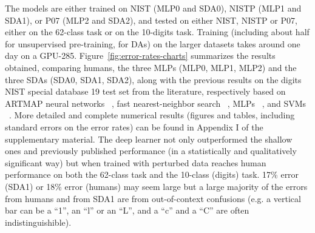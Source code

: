 \documentclass{article} %
\begin{document}
The models are either trained on NIST (MLP0 and SDA0), 
NISTP (MLP1 and SDA1), or P07 (MLP2 and SDA2), and tested
on either NIST, NISTP or P07, either on the 62-class task
or on the 10-digits task. Training (including about half
for unsupervised pre-training, for DAs) on the larger
datasets takes around one day on a GPU-285.
Figure~\ref{fig:error-rates-charts} summarizes the results obtained,
comparing humans, the three MLPs (MLP0, MLP1, MLP2) and the three SDAs (SDA0, SDA1,
SDA2), along with the previous results on the digits NIST special database
19 test set from the literature, respectively based on ARTMAP neural
networks ~\citep{Granger+al-2007}, fast nearest-neighbor search
~\citep{Cortes+al-2000}, MLPs ~\citep{Oliveira+al-2002-short}, and SVMs
~\citep{Milgram+al-2005}.  More detailed and complete numerical results
(figures and tables, including standard errors on the error rates) can be
found in Appendix I of the supplementary material.  
The deep learner not only outperformed the shallow ones and
previously published performance (in a statistically and qualitatively
significant way) but when trained with perturbed data
reaches human performance on both the 62-class task
and the 10-class (digits) task. 
17\% error (SDA1) or 18\% error (humans) may seem large but a large
majority of the errors from humans and from SDA1 are from out-of-context
confusions (e.g. a vertical bar can be a ``1'', an ``l'' or an ``L'', and a
``c'' and a ``C'' are often indistinguishible).
\end{document}
